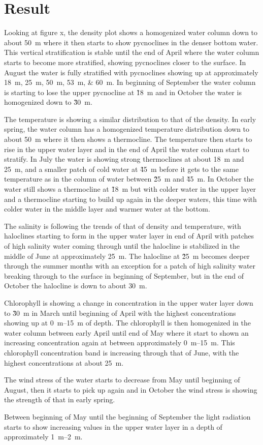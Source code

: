 \documentclass[../Main.tex]{subfiles}
\begin{document}
\section{Result}
Looking at figure x, the density plot shows a homogenized water column down to about \SI{50}{m} where it then starts to show pycnoclines in the denser bottom water.
 This vertical stratification is stable until the end of April where the water column starts to become more stratified, showing pycnoclines closer to the surface.
In August the water is fully stratified with pycnoclines showing up at approximately \SIlist[single]{18;25;50;53;60}{m}. 
In beginning of September the water column is starting to lose the upper pycnocline at \~\SI{18}{m} and in October the water is homogenized down to \~\SI{30}{m}.

The temperature is showing a similar distribution to that of the density. 
In early spring, the water column has a homogenized temperature distribution down to about \SI{50}{m} where it then shows a thermocline. 
The temperature then starts to rise in the upper water layer and in the end of April the water column start to stratify. 
In July the water is showing strong thermoclines at about \SI{18}{m} and \SI{25}{m}, and a smaller patch of cold water at \~\SI{45}{m} before it gets to the same temperature as in the column of water between \~\SI{25}{m} and \~\SI{45}{m}. 
In October the water still shows a thermocline at \~\SI{18}{m} but with colder water in the upper layer and a thermocline starting to build up again in the deeper waters, this time with colder water in the middle layer and warmer water at the bottom. 

The salinity is following the trends of that of density and temperature, with haloclines starting to form in the upper water layer in end of April with patches of high salinity water coming through until the halocline is stabilized in the middle of June at approximately \SI{25}{m}. 
The halocline at \~\SI{25}{m} becomes deeper through the summer months with an exception for a patch of high salinity water breaking through to the surface in beginning of September, but in the end of October the halocline is down to about \SI{30}{m}. 

Chlorophyll is showing a change in concentration in the upper water layer down to \~\SI{30}{m} in March until beginning of April with the highest concentrations showing up at \SIrange{0}{15}{m} of depth. 
The chlorophyll is then homogenized in the water column between early April until end of May where it start to shown an increasing concentration again at between approximately \SIrange{0}{15}{m}. 
This chlorophyll concentration band is increasing through that of June, with the highest concentrations at about \SI{25}{m}. 

The wind stress of the water starts to decrease from May until beginning of August, then it starts to pick up again and in October the wind stress is showing the strength of that in early spring. 

Between beginning of May until the beginning of September the light radiation starts to show increasing values in the upper water layer in a depth of approximately \SIrange{1}{2}{m}.
\end{document}
